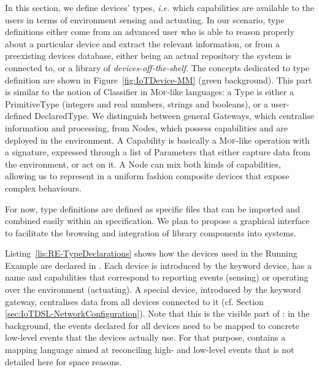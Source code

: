 In this section, we define \IOT devices' types, \textit{i.e.} which capabilities are available to the users in terms of environment sensing and actuating. In our scenario, type definitions either come from an advanced user who is able to reason properly about a particular device and extract the relevant information, or from a preexisting devices database, either being an actual repository the system is connected to, or a library of \textit{devices-off-the-shelf}. The concepts dedicated to type definition are shown in Figure~\ref{fig:IoTDevice-MM} (green background). This part is similar to the notion of \textsf{Classifier} in \textsc{Mof}-like languages: a \textsf{Type} is either a \textsf{PrimitiveType} (integers and real numbers, strings and booleans), or a user-defined \textsf{DeclaredType}. We distinguish between general \textsf{Gateway}s, which centralise information and processing, from \textsf{Node}s, which possess capabilities and are deployed in the environment. A \textsf{Capability} is basically a \textsc{Mof}-like operation with a signature, expressed through a list of \textsf{Parameter}s that either capture data from the environment, or act on it. A \textsf{Node} can mix both kinds of capabilities, allowing us to represent in a uniform fashion composite devices that expose complex behaviours.

For now, type definitions are defined as specific files that can be imported and combined easily within an \IOT specification. We plan to propose a graphical interface to facilitate the browsing and integration of library components into \IOT systems.

Listing~\ref{lis:RE-TypeDeclarations} shows how the devices used in the Running Example are declared in \IOTDSL. Each device is introduced by the keyword \textsf{device}, has a name and capabilities that correspond to reporting events (\textsf{sensing}) or operating over the environment (\textsf{actuating}). A special device, introduced by the keyword \textsf{gateway}, centralises data from all devices connected to it (cf. Section \ref{sec:IoTDSL-NetworkConfiguration}). Note that this is the visible part of \IOTDSL: in the background, the events declared for all devices need to be mapped to concrete low-level events that the devices actually use. For that purpose, \IOTDSL contains a mapping language aimed at reconciling high- and low-level events that is not detailed here for space reasons.

